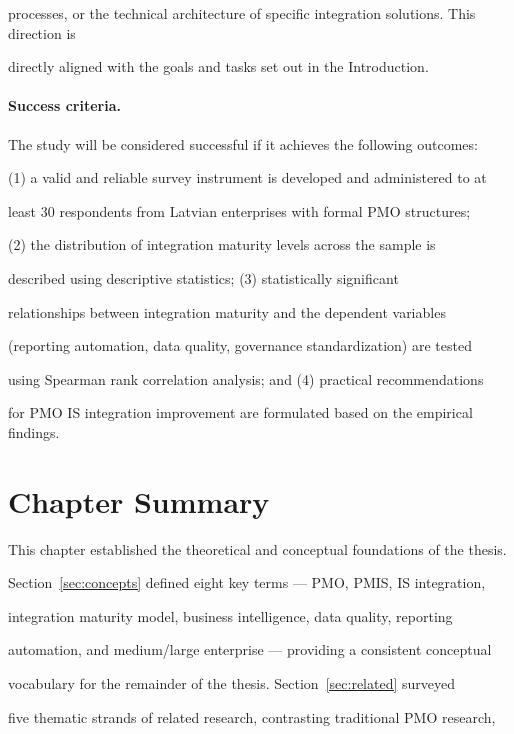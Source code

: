 processes, or the technical architecture of specific integration solutions. This direction is 

directly aligned with the goals and tasks set out in the Introduction. 

 

\paragraph{Success criteria.} 

The study will be considered successful if it achieves the following outcomes:  

(1) a valid and reliable survey instrument is developed and administered to at  

least 30 respondents from Latvian enterprises with formal PMO structures;  

(2) the distribution of integration maturity levels across the sample is  

described using descriptive statistics; (3) statistically significant  

relationships between integration maturity and the dependent variables  

(reporting automation, data quality, governance standardization) are tested 

using Spearman rank correlation analysis; and (4) practical recommendations  

for PMO IS integration improvement are formulated based on the empirical findings. 

\section{Chapter Summary} 

\label{sec:summary} 

  

This chapter established the theoretical and conceptual foundations of the thesis.  

Section~\ref{sec:concepts} defined eight key terms --- PMO, PMIS, IS integration,  

integration maturity model, business intelligence, data quality, reporting  

automation, and medium/large enterprise --- providing a consistent conceptual  

vocabulary for the remainder of the thesis. Section~\ref{sec:related} surveyed  

five thematic strands of related research, contrasting traditional PMO research,  

